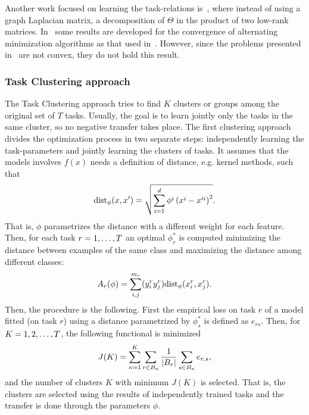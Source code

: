 Another work focused on learning the task-relations is~\cite{Dinuzzo13}, where instead of using a graph Laplacian matrix, a decomposition of $\Theta$ in the product of two low-rank matrices.
In~\cite{CilibertoMPR15} some results are developed for the convergence of alternating minimization algorithms as that used in~\cite{ZhangY13a}. However, since the problems presented in~\cite{argyriou2013learning,Dinuzzo13} are not convex, they do not hold this result.


\subsubsection*{Task Clustering approach}
The Task Clustering approach tries to find $K$ clusters or groups among the original set of $T$ tasks. Usually, the goal is to learn jointly only the tasks in the same cluster, so no negative transfer takes place.
The first clustering approach~\cite{ThrunO96} divides the optimization process in two separate steps: independently learning the task-parameters and jointly learning the clusters of tasks.
It assumes that the models involves $f(x)$ needs a definition of distance, e.g. kernel methods, such that
$$ \text{dist}_\phi(x, x') = \sqrt{\sum_{i=1}^d \phi^i \left( x^i - x'^i \right)^2}. $$
That is, $\phi$ parametrizes the distance with a different weight for each feature.
Then, for each task $r=1, \ldots, T$ an optimal $\phi_r^*$ is computed minimizing the distance between examples of the same class and maximizing the distance among different classes:
\begin{equation}
    \nonumber
    A_r(\phi) = \sum_{i, j}^{m_r} (y_i^r  y_j^r) \text{dist}_\phi(x_i^r, x_j^r).
\end{equation}
Then, the procedure is the following. First the empirical loss on task $r$ of a model fitted (on task $r$) using a distance parametrized by $\phi_s^*$ is defined as $e_{rs}$. Then, for $K = 1, 2,  \ldots, T$, the following functional is minimized
\begin{equation}
    \nonumber
    J(K) = \sum_{\kappa = 1}^K \sum_{r \in B_\kappa} \frac{1}{\left|B_r\right|} \sum_{s \in B_\kappa} e_{r, s} ,
\end{equation}
and the number of clusters $K$ with minimum $J(K)$ is selected. That is, the clusters are selected using the results of independently trained tasks and the transfer is done through the parameters $\phi$.
%

